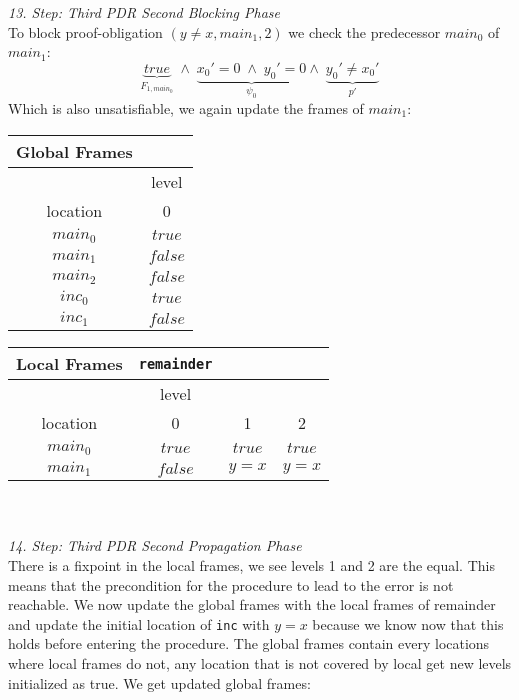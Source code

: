 \documentclass{article}
\begin{document}
	\textsl{13. Step: Third PDR Second Blocking Phase} \\
	To block proof-obligation $(y \neq x, main_1, 2)$ we check the predecessor $main_0$ of $main_1$: \\
	\begin{equation*}
	\underbrace{true}_{F_{1, main_0}}\; \land \; \underbrace{x_0' = 0 \; \land \; y_0' = 0}_{\psi_0} \land \; \underbrace{y_0' \neq x_0'}_{p'}
	\end{equation*}
	Which is also unsatisfiable, we again update the frames of $main_1$: \\ 
	\begin{minipage}{.4\textwidth}
		\setlength\tabcolsep{0.35em}
		\begin{center}
			\begin{tabu}{cc}
				Global Frames \\
				\toprule
				& level \\
				\cmidrule(lr){2-2}
				location & 0 \\
				$main_0$ & $true$ \\
				$main_1$ & $false$ \\
				$main_2$ & $false$ \\
				$inc_0$ & $true$ \\
				$inc_1$ & $false$\\
				\bottomrule
			\end{tabu}
		\end{center}
	\end{minipage}
	\hfill
	\begin{minipage}{.5\textwidth}
		\setlength\tabcolsep{0.35em}
		\begin{center}
			\begin{tabu}{cccc}
				Local Frames & \texttt{remainder}\\
				\toprule
				& level \\
				\cmidrule(lr){2-4}
				location & 0 & 1 & 2 \\
				\cmidrule{1-4}
				$main_0$ & $true$ & $true$ & $true$ \\
				$main_1$ & $false$ & $y = x$ & $y = x$\\
				\bottomrule
			\end{tabu}
		\end{center}	
	\end{minipage} \\ \\
	\textsl{14. Step: Third PDR Second Propagation Phase} \\
	There is a fixpoint in the local frames, we see levels 1 and 2 are the equal.
	This means that the precondition for the procedure to lead to the error is not reachable.
	We now update the global frames with the local frames of remainder and update the initial location of \texttt{inc} with $y = x$ because we know now that this holds before entering the procedure. The global frames contain every locations where local frames do not, any location that is not covered by local get new levels initialized as true. We get updated global frames: \\
	
\end{document}
